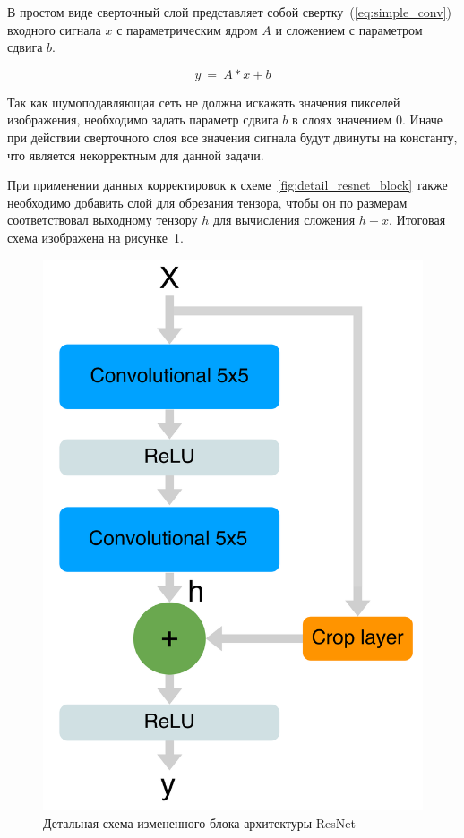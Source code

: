 В простом виде сверточный слой представляет собой свертку~(\ref{eq:simple_conv})  входного сигнала $x$ с параметрическим ядром $A$ и сложением с параметром сдвига $b$.

\begin{equation}\label{eq:simple_conv}
y\ =\ A \ast x + b
\end{equation}

Так как шумоподавляющая сеть не должна искажать значения пикселей изображения, необходимо задать параметр сдвига $b$ в слоях значением $0$. Иначе при действии сверточного слоя все значения сигнала будут двинуты на константу, что является некорректным для данной задачи.

При применении данных корректировок к схеме~\ref{fig:detail_resnet_block} также необходимо добавить слой для обрезания тензора, чтобы он по размерам соответствовал выходному тензору $h$ для вычисления сложения $h + x$. Итоговая схема изображена на рисунке~\ref{fig:detail_adjuster_resnet_block}.


\begin{figure}[h!]
	\centering
	\includegraphics[width=\textwidth / 3]{img/resnet_adjusted}
	\caption{Детальная схема измененного блока архитектуры ResNet} 
	\label{fig:detail_adjuster_resnet_block}
\end{figure}


